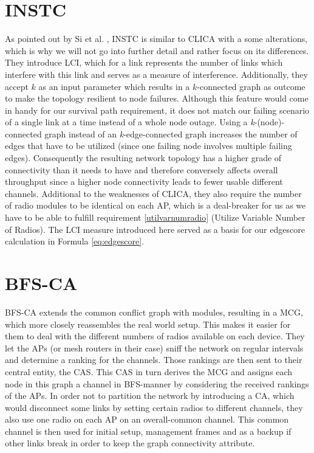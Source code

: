   \section{\ac{INSTC}}
    As pointed out by Si et al. \cite{overview_caa}, \ac{INSTC} \cite{INSTC} is similar to \ac{CLICA} \cite{CLICA} with a some alterations, 
    which is why we will not go into further detail and rather focus on its differences. 
    They introduce \ac{LCI}, which for a link represents the number of links which interfere with this link and serves as a measure of 
    interference. Additionally, they accept \(k\) as an input parameter which results in a \(k\)-connected graph as outcome to make the topology resilient to node failures.
    Although this feature would come in handy for our survival path requirement, it does not match our failing scenario of a single link at a time instead of a whole node outage.
    Using a \textit{k}-(node)-connected graph instead of an \textit{k}-edge-connected graph increases the number of edges that have to be utilized 
    (since one failing node involves multiple failing edges). Consequently the resulting network topology has a higher grade of connectivity than it needs to 
    have and therefore conversely affects overall throughput since a higher node connectivity leads to fewer usable different channels. 
    Additional to the weaknesses of \ac{CLICA}, they also require the number of radio modules to be identical on each \ac{AP}, 
    which is a deal-breaker for us as we have to be able to fulfill requirement \ref{utilvarnumradio} (Utilize Variable Number of Radios).
    The \ac{LCI} measure introduced here served as a basis for our edgescore calculation in Formula \ref{eq:edgescore}.
    
  \section{\ac{BFS-CA}}
    \ac{BFS-CA} \cite{BFS-CA} extends the common conflict graph with modules, resulting in a \ac{MCG}, which more closely reassembles the
    real world setup. This makes it easier for them to deal with the different numbers of radios available on each device. 
    They let the APs (or mesh routers in their case) sniff the network on regular intervals and determine a ranking for the channels.
    Those rankings are then sent to their central entity, the \ac{CAS}. This \ac{CAS} in turn derives the \ac{MCG} and assigns each node in this graph 
    a channel in \ac{BFS}-manner by considering the received rankings of the APs. In order not to partition the network by introducing a \ac{CA}, which 
    would disconnect some links by setting certain radios to different channels, they also use one radio on each AP on an overall-common channel.
    This common channel is then used for initial setup, management frames and as a backup if other links break in order to keep the graph connectivity attribute.
    

